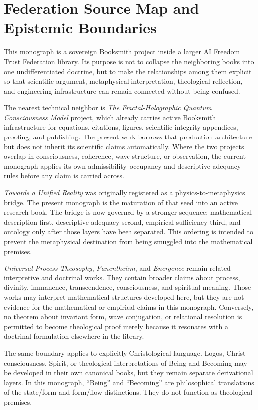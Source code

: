 \chapter{Federation Source Map and Epistemic Boundaries}

This monograph is a sovereign Booksmith project inside a larger AI Freedom Trust Federation library. Its purpose is not to collapse the neighboring books into one undifferentiated doctrine, but to make the relationships among them explicit so that scientific argument, metaphysical interpretation, theological reflection, and engineering infrastructure can remain connected without being confused.

The nearest technical neighbor is \emph{The Fractal-Holographic Quantum Consciousness Model} project, which already carries active Booksmith infrastructure for equations, citations, figures, scientific-integrity appendices, proofing, and publishing. The present work borrows that production architecture but does not inherit its scientific claims automatically. Where the two projects overlap in consciousness, coherence, wave structure, or observation, the current monograph applies its own admissibility--occupancy and descriptive-adequacy rules before any claim is carried across.

\emph{Towards a Unified Reality} was originally registered as a physics-to-metaphysics bridge. The present monograph is the maturation of that seed into an active research book. The bridge is now governed by a stronger sequence: mathematical description first, descriptive adequacy second, empirical sufficiency third, and ontology only after those layers have been separated. This ordering is intended to prevent the metaphysical destination from being smuggled into the mathematical premises.

\emph{Universal Process Theosophy}, \emph{Panentheism}, and \emph{Energence} remain related interpretive and doctrinal works. They contain broader claims about process, divinity, immanence, transcendence, consciousness, and spiritual meaning. Those works may interpret mathematical structures developed here, but they are not evidence for the mathematical or empirical claims in this monograph. Conversely, no theorem about invariant form, wave conjugation, or relational resolution is permitted to become theological proof merely because it resonates with a doctrinal formulation elsewhere in the library.

The same boundary applies to explicitly Christological language. Logos, Christ-consciousness, Spirit, or theological interpretations of Being and Becoming may be developed in their own canonical books, but they remain separate derivational layers. In this monograph, ``Being'' and ``Becoming'' are philosophical translations of the state/form and form/flow distinctions. They do not function as theological premises.

